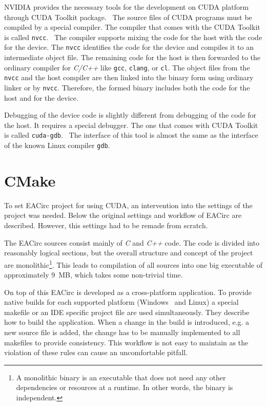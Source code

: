 \documentclass[12pt,oneside]{fithesis2}
\begin{document}
NVIDIA provides the necessary tools for the development on CUDA platform through CUDA Toolkit package.~\cite{cuda_toolkit} The source files of CUDA programs must be compiled by a special compiler. The compiler that comes with the CUDA Toolkit is called \texttt{nvcc}.~\cite{cuda_compiler} The compiler supports mixing the code for the host with the code for the device. The \texttt{nvcc} identifies the code for the device and compiles it to an intermediate object file. The remaining code for the host is then forwarded to the ordinary compiler for \emph{C/C++} like \texttt{gcc}, \texttt{clang}, or \texttt{cl}. The object files from the \texttt{nvcc} and the host compiler are then linked into the binary form using ordinary linker or by \texttt{nvcc}. Therefore, the formed binary includes both the code for the host and for the device.

Debugging of the device code is slightly different from debugging of the code for the host. It requires a special debugger. The one that comes with CUDA Toolkit is called \texttt{cuda-gdb}.~\cite{cuda_gdb} The interface of this tool is almost the same as the interface of the known Linux compiler \texttt{gdb}.






\chapter{CMake}

To set EACirc project for using CUDA, an intervention into the settings of the project was needed. Below the original settings and workflow of EACirc are described. However, this settings had to be remade from scratch.

The EACirc sources consist mainly of \emph{C} and \emph{C++} code. The code is divided into reasonably logical sections, but the overall structure and concept of the project are monolithic\footnote{A monolithic binary is an executable that does not need any other dependencies or resources at a runtime. In other words, the binary is independent.}. This leads to compilation of all sources into one big executable of approximately 9~MB, which takes some non-trivial time.

On top of this EACirc is developed as a cross-platform application. To provide native builds for each supported platform (Windows~\cite{win} and Linux) a special makefile or an IDE specific project file are used simultaneously. They describe how to build the application. When a change in the build is introduced, e.g. a new source file is added, the change has to be manually implemented to all makefiles to provide consistency. This workflow is not easy to maintain as the violation of these rules can cause an uncomfortable pitfall.
\end{document}
